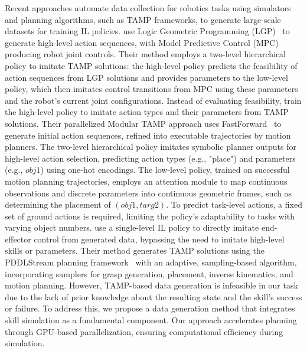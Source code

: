Recent approaches automate data collection for robotics tasks using simulators and planning algorithms, such as TAMP frameworks, to generate large-scale datasets for training IL policies. \citet{driess2021learning} use Logic Geometric Programming (LGP)~\cite{toussaint2018differentiable} to generate high-level action sequences, with Model Predictive Control (MPC) producing robot joint controls. Their method employs a two-level hierarchical policy to imitate TAMP solutions: the high-level policy predicts the feasibility of action sequences from LGP solutions and provides parameters to the low-level policy, which then imitates control transitions from MPC using these parameters and the robot's current joint configurations. Instead of evaluating feasibility, \citet{mcdonald2022guided} train the high-level policy to imitate action types and their parameters from TAMP solutions. Their parallelized Modular TAMP approach uses FastForward~\cite{hoffmann2001ff} to generate initial action sequences, refined into executable trajectories by motion planners. The two-level hierarchical policy imitates symbolic planner outputs for high-level action selection, predicting action types (e.g., "place") and parameters (e.g., $obj1$) using one-hot encodings. The low-level policy, trained on successful motion planning trajectories, employs an attention module to map continuous observations and discrete parameters into continuous geometric frames, such as determining the placement of $(obj1, targ2)$. To predict task-level actions, a fixed set of ground actions is required, limiting the policy's adaptability to tasks with varying object numbers. \citet{dalal2023imitating} use a single-level IL policy to directly imitate end-effector control from generated data, bypassing the need to imitate high-level skills or parameters. Their method generates TAMP solutions using the PDDLStream planning framework~\cite{garrett2020pddlstream} with an adaptive, sampling-based algorithm, incorporating samplers for grasp generation, placement, inverse kinematics, and motion planning. However, TAMP-based data generation is infeasible in our task due to the lack of prior knowledge about the resulting state and the skill’s success or failure. To address this, we propose a data generation method that integrates skill simulation as a fundamental component. Our approach accelerates planning through GPU-based parallelization, ensuring computational efficiency during simulation.

